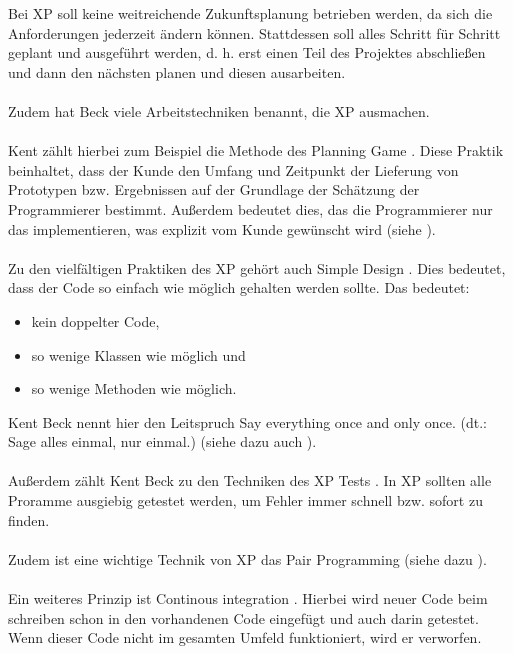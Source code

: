 \documentclass[a4paper, 10pt]{scrartcl}
\begin{document}
Bei XP soll keine weitreichende Zukunftsplanung betrieben werden, da sich die Anforderungen jederzeit ändern können. Stattdessen soll alles Schritt für Schritt geplant und ausgeführt werden, d. h. erst einen Teil des Projektes abschließen und dann den nächsten planen und diesen ausarbeiten.\\\\
Zudem hat Beck viele Arbeitstechniken benannt, die XP ausmachen.\\\\
Kent zählt hierbei zum Beispiel die Methode des \glqq Planning Game\grqq{} \citep{beck1999}. Diese Praktik beinhaltet, dass der Kunde den Umfang und Zeitpunkt der Lieferung von Prototypen bzw. Ergebnissen auf der Grundlage der Schätzung der Programmierer bestimmt. Außerdem bedeutet dies, das die Programmierer nur das implementieren, was explizit vom Kunde gewünscht wird (siehe ).\\\\
Zu den vielfältigen Praktiken des XP gehört auch \glqq Simple Design\grqq{} \citep{beck1999}. Dies bedeutet, dass der Code so einfach wie möglich gehalten werden sollte. Das bedeutet: 
\begin{itemize}
\item kein doppelter Code, 
\item so wenige Klassen wie möglich und
\item so wenige Methoden wie möglich.
\end{itemize}
Kent Beck nennt hier den Leitspruch \glqq Say everything once and only once. (dt.: Sage alles einmal, nur einmal.)\grqq \cite{beck1999} (siehe dazu auch ).\\\\
Außerdem zählt Kent Beck zu den Techniken des XP \glqq Tests\grqq{} \citep{beck1999}. In XP sollten alle Proramme ausgiebig getestet werden, um Fehler immer schnell bzw. sofort zu finden.\\\\
Zudem ist eine wichtige Technik von XP das \glqq Pair Programming\grqq{} \citep{beck1999} (siehe dazu ).\\\\
Ein weiteres Prinzip ist \glqq Continous integration\grqq{} \citep{beck1999}. Hierbei  wird neuer Code beim schreiben schon in den vorhandenen Code eingefügt und auch darin getestet. Wenn dieser Code nicht im gesamten Umfeld funktioniert, wird er verworfen.\\\\
\end{document}
